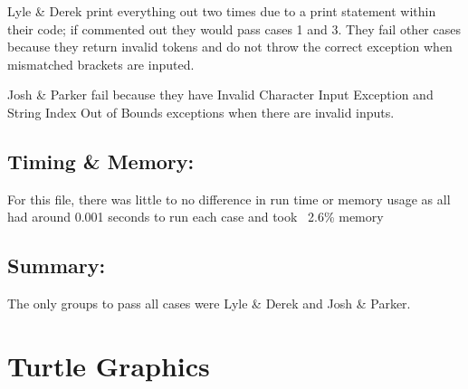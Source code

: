 \documentclass[12pt]{article}
\begin{document}
\begin{table}[H]
	\centering
\end{table}
Lyle \& Derek print everything out two times due to a print statement within their code; if
commented out they would pass cases 1 and 3. They fail other cases because they return invalid
tokens and do not throw the correct exception when mismatched brackets are inputed.


Josh \& Parker fail because they have Invalid Character Input Exception and String Index Out of
Bounds exceptions when there are invalid inputs.

\subsection{Timing \& Memory:}
For this file, there was little to no difference in run time or memory usage as all had around
0.001 seconds to run each case and took ~2.6\% memory


\subsection{Summary:}

The only groups to pass all cases were Lyle \& Derek and Josh \& Parker.
\newpage

\section{Turtle Graphics}
\end{document}
